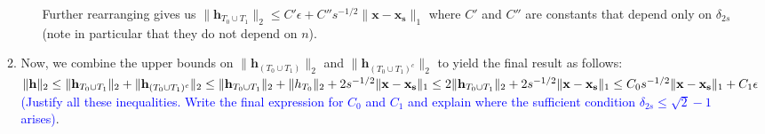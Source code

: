 \documentclass[11pt]{article}
\begin{document}
\begin{enumerate}
\begin{enumerate}
\begin{enumerate}
Further rearranging gives us
$\|\mathbf{h}_{T_0 \cup T_1}\|_2  \leq C' \epsilon + C'' s^{-1/2} \|\mathbf{x}-\mathbf{x_s}\|_1$ where $C'$ and $C''$ are constants that depend only on $\delta_{2s}$ (note in particular that they do not depend on $n$).
\end{enumerate}
\item Now, we combine the upper bounds on $\|\mathbf{h}_{(T_0 \cup T_1)}\|_2$ and $\|\mathbf{h}_{(T_0 \cup T_1)^c}\|_2$ to yield the final result as follows: \\
$\|\mathbf{h}\|_2 \leq \|\mathbf{h}_{T_0 \cup T_1}\|_2 + \|\mathbf{h}_{(T_0 \cup T_1)^c}\|_2 \leq \|\mathbf{h}_{T_0 \cup T_1}\|_2 + \|h_{T_0}\|_2 + 2s^{-1/2}\|\mathbf{x}-\mathbf{x_s}\|_1 \\
\leq 2 \|\mathbf{h}_{T_0 \cup T_1}\|_2 + 2s^{-1/2}\|\mathbf{x}-\mathbf{x_s}\|_1 \leq C_0 s^{-1/2} \|\mathbf{x}-\mathbf{x_s}\|_1 + C_1 \epsilon$ \textcolor{blue}{(Justify all these inequalities. Write the final expression for $C_0$ and $C_1$ and explain where the sufficient condition $\delta_{2s} \leq \sqrt{2}-1$ arises)}.
\end{enumerate}


\end{enumerate}
\end{document}
